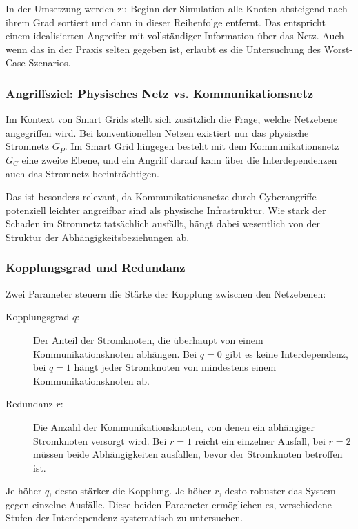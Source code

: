 In der Umsetzung werden zu Beginn der Simulation alle Knoten absteigend nach ihrem Grad sortiert und dann in dieser Reihenfolge entfernt. Das entspricht einem idealisierten Angreifer mit vollständiger Information über das Netz. Auch wenn das in der Praxis selten gegeben ist, erlaubt es die Untersuchung des Worst-Case-Szenarios.

\subsubsection{Angriffsziel: Physisches Netz vs. Kommunikationsnetz}

Im Kontext von Smart Grids stellt sich zusätzlich die Frage, welche Netzebene angegriffen wird. Bei konventionellen Netzen existiert nur das physische Stromnetz $G_P$. Im Smart Grid hingegen besteht mit dem Kommunikationsnetz $G_C$ eine zweite Ebene, und ein Angriff darauf kann über die Interdependenzen auch das Stromnetz beeinträchtigen.

Das ist besonders relevant, da Kommunikationsnetze durch Cyberangriffe potenziell leichter angreifbar sind als physische Infrastruktur. Wie stark der Schaden im Stromnetz tatsächlich ausfällt, hängt dabei wesentlich von der Struktur der Abhängigkeitsbeziehungen ab.

\subsubsection{Kopplungsgrad und Redundanz}

Zwei Parameter steuern die Stärke der Kopplung zwischen den Netzebenen:

\begin{description}
    \item[Kopplungsgrad $q$:] Der Anteil der Stromknoten, die überhaupt von einem Kommunikationsknoten abhängen. Bei $q = 0$ gibt es keine Interdependenz, bei $q = 1$ hängt jeder Stromknoten von mindestens einem Kommunikationsknoten ab.
    \item[Redundanz $r$:] Die Anzahl der Kommunikationsknoten, von denen ein abhängiger Stromknoten versorgt wird. Bei $r = 1$ reicht ein einzelner Ausfall, bei $r = 2$ müssen beide Abhängigkeiten ausfallen, bevor der Stromknoten betroffen ist.
\end{description}

Je höher $q$, desto stärker die Kopplung. Je höher $r$, desto robuster das System gegen einzelne Ausfälle. Diese beiden Parameter ermöglichen es, verschiedene Stufen der Interdependenz systematisch zu untersuchen.

